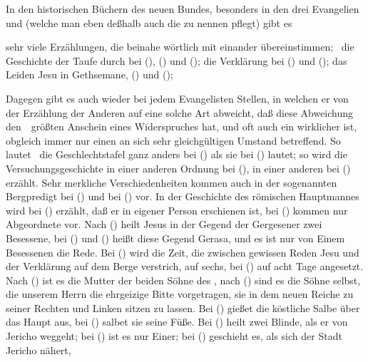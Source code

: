 \begin{aufza}
\item In den historischen Büchern des neuen Bundes, besonders in den drei Evangelien  und  (welche man eben deßhalb auch die  zu nennen pflegt) gibt es
\begin{aufzb}
\item sehr viele Erzählungen, die beinahe wörtlich mit einander übereinstimmen; \zB\ die Geschichte der Taufe  durch  bei  (),  () und  (); die Verklärung  bei  () und  (); das Leiden Jesu in Gethsemane,  () und  (); \uam
\item Dagegen gibt es auch wieder bei jedem Evangelisten Stellen, in welchen er von der Erzählung der Anderen auf eine solche Art abweicht, daß diese Abweichung den~\ größten Anschein eines Widerspruches hat, und oft auch ein wirklicher ist, obgleich immer nur einen an sich sehr gleichgültigen Umstand betreffend. So lautet \zB\ die Geschlechtstafel  ganz anders bei  () als sie bei  () lautet; so wird die Versuchungsgeschichte  in einer anderen Ordnung bei  (), in einer anderen bei  () erzählt. Sehr merkliche Verschiedenheiten kommen auch in der sogenannten Bergpredigt bei  () und bei  () vor. In der Geschichte des römischen Hauptmannes wird bei  () erzählt, daß er in eigener Person erschienen ist, bei  () kommen nur Abgeordnete vor. Nach  () heilt Jesus in der Gegend der Gergesener zwei Besessene, bei  () und  () heißt diese Gegend Gerasa, und es ist nur von Einem Besessenen die Rede. Bei  () wird die Zeit, die zwischen gewissen Reden Jesu und der Verklärung auf dem Berge verstrich, auf sechs, bei  () auf acht Tage angesetzt. Nach  () ist es die Mutter der beiden Söhne des , nach  () sind es die Söhne selbst, die unserem Herrn die ehrgeizige Bitte vorgetragen, sie in dem neuen Reiche zu seiner Rechten und Linken sitzen zu lassen. Bei  () gießet  die köstliche Salbe über das Haupt  aus, bei  () salbet sie seine Füße. Bei  () heilt  zwei Blinde, als er von Jericho weggeht; bei  () ist es nur Einer; bei  () geschieht es, als  sich der Stadt Jericho nähert, \uam

\end{aufzb}
\end{aufza}

